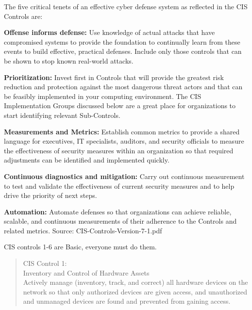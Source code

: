 \documentclass[Screen16to9,17pt]{foils}
\begin{document}

\begin{list2}
\item
The five critical tenets of an effective cyber defense system as reflected
in the CIS Controls are:
\item {\bf Offense informs defense:} Use knowledge of actual attacks that have
compromised systems to provide the foundation to continually learn
from these events to build effective, practical defenses. Include only
those controls that can be shown to stop known real-world attacks.
\item {\bf Prioritization:} Invest first in Controls that will provide the greatest risk
reduction and protection against the most dangerous threat actors
and that can be feasibly implemented in your computing environment.
The CIS Implementation Groups discussed below are a great place for
organizations to start identifying relevant Sub-Controls.
\item {\bf Measurements and Metrics:} Establish common metrics to provide a
shared language for executives, IT specialists, auditors, and security
officials to measure the effectiveness of security measures within
an organization so that required adjustments can be identified and
implemented quickly.
\item {\bf Continuous diagnostics and mitigation:} Carry out continuous
measurement to test and validate the effectiveness of current security
measures and to help drive the priority of next steps.
\item {\bf Automation:} Automate defenses so that organizations can achieve
reliable, scalable, and continuous measurements of their adherence to
the Controls and related metrics. \hskip 2cm Source: CIS-Controls-Version-7-1.pdf
\end{list2}



CIS controls 1-6 are Basic, everyone must do them.


\begin{quote}
CIS Control 1:\\
Inventory and Control of Hardware Assets\\
Actively manage (inventory, track, and correct) all hardware devices on the network so that only authorized devices are given access, and unauthorized and unmanaged devices are found and prevented from gaining access.
\end{quote}
\end{document}
